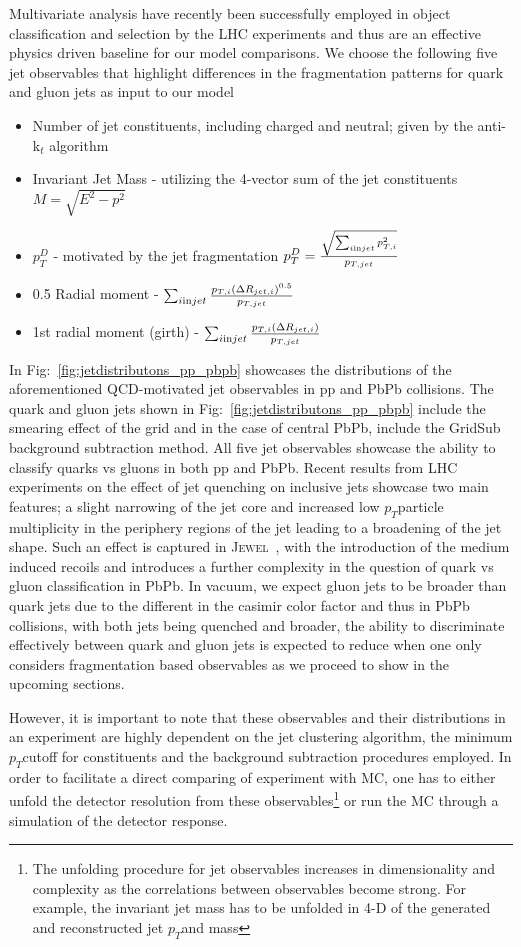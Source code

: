 \documentclass[notoc]{JHEP3}
\newcommand{\pt}{$p_{T}$}
\newcommand{\jw}{\textsc{Jewel}~}
\def\in{{\rm in}}
\begin{document}
	Multivariate analysis have recently been successfully employed in object classification and selection by the LHC experiments and thus are an effective physics driven baseline for our model comparisons. We choose the following five jet observables that highlight differences in the fragmentation patterns for quark and gluon jets as input to our model
	\begin{itemize}
		\item Number of jet constituents, including charged and neutral; given by the anti-k$_{t}$ algorithm
		\item Invariant Jet Mass - utilizing the 4-vector sum of the jet constituents  $M = \sqrt{E^{2} - p^{2}}$
		\item $p_{T}^{D}$ - motivated by the jet fragmentation $p^{D}_{T} = \frac{\sqrt{\sum_{i \in jet} p^{2}_{T,i}}}{p_{T, jet}}$
		\item 0.5 Radial moment - $\sum_{i \in jet} \frac{p_{T, i} (\Delta R_{jet, i})^{0.5}}{p_{T, jet}}$
		\item 1st radial moment (girth) - $\sum_{i \in jet} \frac{p_{T, i} (\Delta R_{jet, i})}{p_{T, jet}}$
	\end{itemize}
	
	 In Fig:~\ref{fig:jetdistributons_pp_pbpb} showcases the distributions of the aforementioned QCD-motivated jet observables in pp and PbPb collisions. The quark and gluon jets shown in Fig:~\ref{fig:jetdistributons_pp_pbpb} include the smearing effect of the grid and in the case of central PbPb, include the GridSub background subtraction method. All five jet observables showcase the ability to classify quarks vs gluons in both pp and PbPb. Recent results from LHC experiments on the effect of jet quenching on inclusive jets showcase two main features; a slight narrowing of the jet core and increased low \pt particle multiplicity in the periphery regions of the jet leading to a broadening of the jet shape. Such an effect is captured in \jw, with the introduction of the medium induced recoils and introduces a further complexity in the question of quark vs gluon classification in PbPb. In vacuum, we expect gluon jets to be broader than quark jets due to the different in the casimir color factor and thus in PbPb collisions, with both jets being quenched and broader, the ability to discriminate effectively between quark and gluon jets is expected to reduce when one only considers fragmentation based observables as we proceed to show in the upcoming sections.
	
	 However, it is important to note that these observables and their distributions in an experiment are highly dependent on the jet clustering algorithm, the minimum \pt cutoff for constituents and the background subtraction procedures employed. In order to facilitate a direct comparing of experiment with MC, one has to either unfold the detector resolution from these observables\footnote{The unfolding procedure for jet observables increases in dimensionality and complexity as the correlations between observables become strong. For example, the invariant jet mass has to be unfolded in 4-D of the generated and reconstructed jet \pt and mass} or run the MC through a simulation of the detector response.
	
\end{document}
